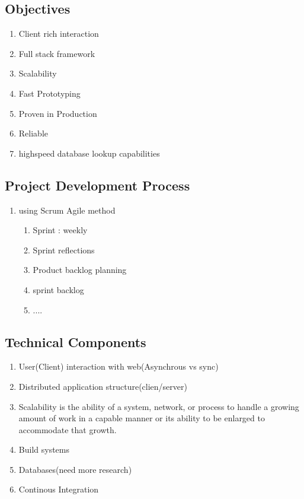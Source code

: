 
\subsection{Objectives}
\begin{enumerate}
	\item Client rich interaction
	\item Full stack framework
	\item Scalability
	\item Fast Prototyping
	\item Proven in Production
	\item Reliable
	\item highspeed database lookup capabilities
\end{enumerate}
\subsection{Project Development Process} %
\begin{enumerate}
	\item using Scrum Agile method
	\begin{enumerate}
		\item Sprint : weekly
		\item Sprint reflections
		\item Product backlog planning
		\item sprint backlog
		\item ....
	\end{enumerate}
\end{enumerate} 
\subsection{Technical Components}
\begin{enumerate}
	\item User(Client) interaction with web(Asynchrous vs sync)
	\item Distributed application structure(clien/server)
	\item Scalability is the ability of a system, network, or process to handle a growing amount of work in a capable manner or its ability to be enlarged to accommodate that growth.
	\item Build systems
	\item Databases(need more research)
	\item Continous Integration
\end{enumerate}
